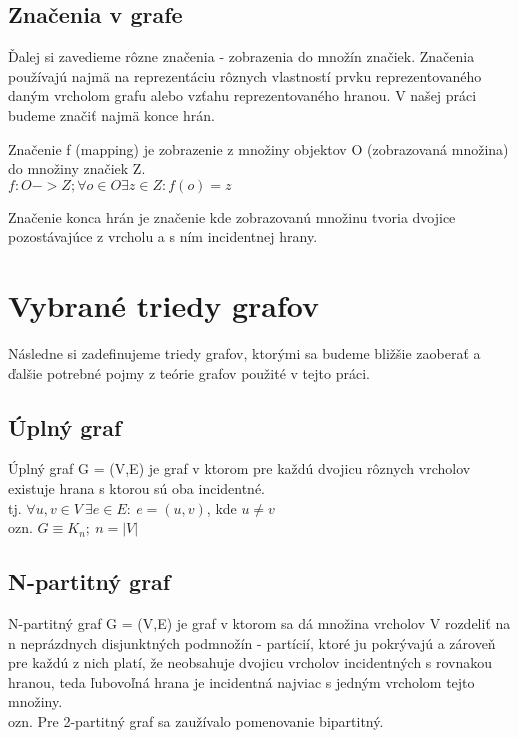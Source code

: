 


\subsection{Značenia v grafe}
Ďalej si zavedieme rôzne značenia - zobrazenia do množín značiek. Značenia používajú najmä na reprezentáciu rôznych vlastností prvku reprezentovaného daným vrcholom grafu alebo vzťahu reprezentovaného hranou. V našej práci budeme značiť najmä konce hrán.\\

\begin{defin}
Značenie f (mapping) je zobrazenie z množiny objektov O (zobrazovaná množina) do množiny značiek Z.\\
$f: O -> Z ; \forall o \in O  \exists z \in Z  : f(o)=z$
\end{defin}

\begin{defin}
Značenie konca hrán je značenie kde zobrazovanú množinu tvoria dvojice pozostávajúce z vrcholu a s ním incidentnej hrany.
\end{defin}

\section{Vybrané triedy grafov}
Následne si zadefinujeme triedy grafov, ktorými sa budeme bližšie zaoberať a ďalšie potrebné pojmy z teórie grafov použité v tejto práci. 

\subsection{Úplný graf}
\begin{defin}
Úplný graf G = (V,E) je graf v ktorom pre každú dvojicu rôznych vrcholov existuje hrana s ktorou sú oba incidentné.\\
tj. $\forall u,v \in V\ \exists e \in  E :\ e=(u,v)$, kde $u \neq v$\\
ozn. $G \equiv K_n;\ n=|V|$
\end{defin}
\subsection{N-partitný graf}
\begin{defin}
N-partitný graf G = (V,E) je graf v ktorom sa dá množina vrcholov V rozdeliť na n neprázdnych disjunktných podmnožín - partícií, ktoré ju pokrývajú a zároveň pre každú z nich platí, že neobsahuje dvojicu vrcholov incidentných s rovnakou hranou, teda ľubovoľná hrana je incidentná najviac s jedným vrcholom tejto množiny.\\
ozn. Pre 2-partitný graf sa zaužívalo pomenovanie bipartitný.
\end{defin}

